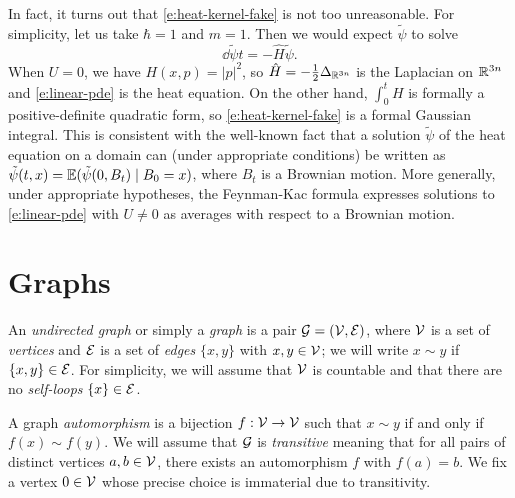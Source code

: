 \begin{rk}
In fact, it turns out that \eqref{e:heat-kernel-fake} is not too unreasonable.
For simplicity, let us take $\hbar = 1$ and $m = 1$.
Then we would expect $\tilde\psi$ to solve
\begin{equation}
\label{e:linear-pde}
\dd{\tilde\psi}{t} = -\hat H \tilde\psi.
\end{equation}
When $U = 0$, we have $H(x, p) = |p|^2$, so $\hat H = -\tfrac12 \Delta_{{\mathbb R}^{3n}}$
is the Laplacian on ${\mathbb R}^{3n}$ and \eqref{e:linear-pde} is the heat equation.
On the other hand, $\int_0^t H$ is formally a positive-definite quadratic form, so
\eqref{e:heat-kernel-fake} is a formal Gaussian integral. This is consistent
with the well-known fact that a solution $\tilde\psi$ of the heat equation
on a domain can (under appropriate conditions) be written as
$\tilde\psi(t, x) = \mathbb{E}(\tilde\psi(0, B_t) \mid B_0 = x)$,
where $B_t$ is a Brownian motion.
More generally, under appropriate hypotheses, the Feynman-Kac formula expresses
solutions to \eqref{e:linear-pde} with $U \ne 0$ as averages with respect to a
Brownian motion.
\end{rk}


\section{Graphs}
\label{sec:graphs}

An \emph{undirected graph} or simply a \emph{graph} is a pair $\mathcal{G} = (\mathcal{V}, \mathcal{E})$,
where $\mathcal{V}$
is a set of \emph{vertices} and $\mathcal{E}$ is a set of
\emph{edges} $\{ x, y \}$ with $x, y \in \mathcal{V}$; we will write $x \sim y$ if
$\{ x, y \} \in \mathcal{E}$.
For simplicity, we will assume that $\mathcal{V}$ is countable and that there are no
\emph{self-loops} $\{ x \} \in \mathcal{E}$.

A graph \emph{automorphism} is a bijection $f : \mathcal{V}\rightarrow\mathcal{V}$ such that
$x \sim y$ if and only if $f(x) \sim f(y)$.
We will assume that $\mathcal{G}$ is \emph{transitive} meaning that for all pairs
of distinct
vertices $a, b \in \mathcal{V}$, there exists an automorphism $f$ with $f(a) = b$.
We fix a vertex $0\in\mathcal{V}$ whose precise choice is immaterial due to
transitivity.


